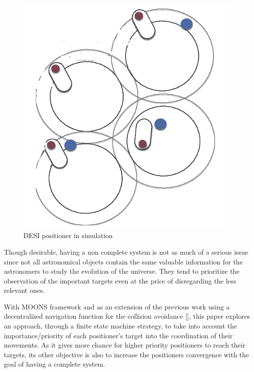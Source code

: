 \documentclass[]{spie}  %
\begin{document}
\begin{figure}[H]
\begin{minipage}[t]{5cm}
			\includegraphics[scale=0.3]{images/DESI_Positioner.png}
			\caption{DESI positioner in simulation}
			\label{DESI_positioner_representation}
		\end{minipage}
	\end{figure}
			
	Though desirable, having a non complete system is not as much of a serious issue since not all astronomical objects contain the same valuable information for the astronomers to study the evolution of the universe. They tend to prioritize the observation of the important targets even at the price of disregarding the less relevant ones.
	
	With MOONS framework and as an extension of the previous work using a decentralized navigation function for the collision avoidance [], this paper explores an approach, through a finite state machine strategy, to take into account the importance/priority of each positioner's target into the coordination of their movements. As it gives more chance for higher priority positioners to reach their targets, its other objective is also to increase the positioners convergence with the goal of having a complete system.\\
		
\end{document}
